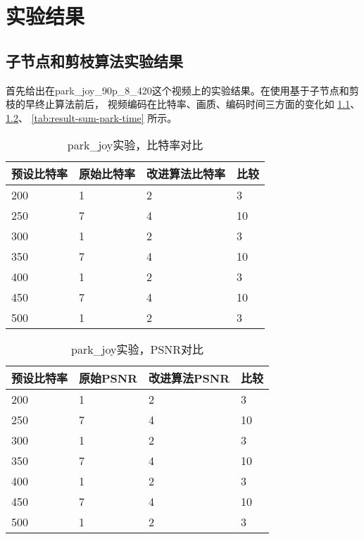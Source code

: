 \chapter{实验结果}
\label{cha:result}

\section{子节点和剪枝算法实验结果}

首先给出在park\_joy\_90p\_8\_420这个视频上的实验结果。在使用基于子节点和剪枝的早终止算法前后，
视频编码在比特率、画质、编码时间三方面的变化如 \ref{tab:result-sum-park-bitrate}、\ref{tab:result-sum-park-psnr}、
\ref{tab:result-sum-park-time} 所示。

\begin{table}[H]
  \centering
    \caption{park\_joy实验，比特率对比}
    \label{tab:result-sum-park-bitrate}
    \begin{tabularx}{\linewidth}{XXXX}
      \toprule[1.5pt]
      预设比特率 & 原始比特率 & 改进算法比特率 & 比较 \\
      \midrule[1pt]
      200 & 1 & 2 & 3  \\
      250 & 7 & 4 & 10 \\
      300 & 1 & 2 & 3  \\
      350 & 7 & 4 & 10 \\
      400 & 1 & 2 & 3  \\
      450 & 7 & 4 & 10 \\
      500 & 1 & 2 & 3  \\
      \bottomrule[1.5pt]
    \end{tabularx}
\end{table}

\begin{table}[H]
  \centering
    \caption{park\_joy实验，PSNR对比}
    \label{tab:result-sum-park-psnr}
    \begin{tabularx}{\linewidth}{XXXX}
      \toprule[1.5pt]
      预设比特率 & 原始PSNR & 改进算法PSNR & 比较 \\
      \midrule[1pt]
      200 & 1 & 2 & 3  \\
      250 & 7 & 4 & 10 \\
      300 & 1 & 2 & 3  \\
      350 & 7 & 4 & 10 \\
      400 & 1 & 2 & 3  \\
      450 & 7 & 4 & 10 \\
      500 & 1 & 2 & 3  \\
      \bottomrule[1.5pt]
    \end{tabularx}
\end{table}


